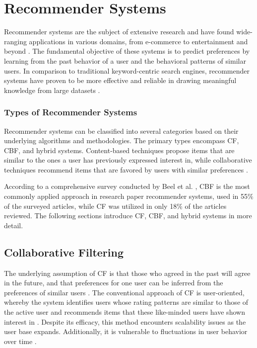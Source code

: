 \section{Recommender Systems} \label{sec:recommender-systems}


Recommender systems are the subject of extensive research and have found wide-ranging applications in various domains, from e-commerce to entertainment and beyond \cite{RicciRecommenderSystems2015,AdomaviciusNextGeneration2005}. The fundamental objective of these systems is to predict preferences by learning from the past behavior of a user and the behavioral patterns of similar users.
In comparison to traditional keyword-centric search engines, recommender systems have proven to be more effective and reliable in drawing meaningful knowledge from large datasets \cite{BaiScientificPaper2020}.


\subsubsection*{Types of Recommender Systems}

Recommender systems can be classified into several categories based on their underlying algorithms and methodologies. The primary types encompass \ac{CF}, \ac{CBF}, and hybrid systems. Content-based techniques propose items that are similar to the ones a user has previously expressed interest in, while collaborative techniques recommend items that are favored by users with similar preferences \cite{BurkeHybridRecommender2002}.

According to a comprehensive survey conducted by Beel et al. \cite{BeelResearchpaperRecommender2016}, \ac{CBF} is the most commonly applied approach in research paper recommender systems, used in 55\% of the surveyed articles, while \ac{CF} was utilized in only 18\% of the articles reviewed.
The following sections introduce \ac{CF}, \ac{CBF}, and hybrid systems in more detail.


\subsection{Collaborative Filtering} \label{sec:collaborative-filtering}

The underlying assumption of \acl{CF} \cite{GoldbergUsingCollaborative1992,ResnickGroupLensOpen1994} is that those who agreed in the past will agree in the future, and that preferences for one user can be inferred from the preferences of similar users \cite{BaiScientificPaper2020}.
The conventional approach of \ac{CF} is user-oriented, whereby the system identifies users whose rating patterns are similar to those of the active user and recommends items that these like-minded users have shown interest in \cite{RicciRecommenderSystems2015}. Despite its efficacy, this method encounters scalability issues as the user base expands. Additionally, it is vulnerable to fluctuations in user behavior over time \cite{SarwarItembasedCollaborative2001}.

